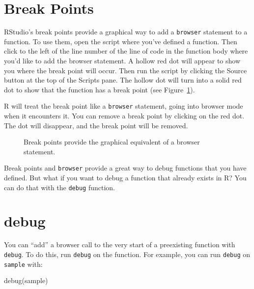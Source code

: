 \documentclass[
  letterpaper,
  DIV=11,
  numbers=noendperiod]{scrbook}
\makeatletter
\newenvironment{Shaded}{\begin{snugshade}}{\end{snugshade}}
\newcommand{\FunctionTok}[1]{\textcolor[rgb]{0.28,0.35,0.67}{#1}}
\newcommand{\NormalTok}[1]{\textcolor[rgb]{0.00,0.23,0.31}{#1}}
\newcommand*\pandocbounded[1]{%
  \sbox\pandoc@box{#1}%
  \Gscale@div\@tempa{\textheight}{\dimexpr\ht\pandoc@box+\dp\pandoc@box\relax}%
  \Gscale@div\@tempb{\linewidth}{\wd\pandoc@box}%
  \ifdim\@tempb\p@<\@tempa\p@\let\@tempa\@tempb\fi%
  \ifdim\@tempa\p@<\p@\scalebox{\@tempa}{\usebox\pandoc@box}%
  \else\usebox{\pandoc@box}%
  \fi%
}
\makeatother
\begin{document}
\section{Break Points}\label{break-points}

RStudio's break points provide a graphical way to add a \texttt{browser}
statement to a function. To use them, open the script where you've
defined a function. Then click to the left of the line number of the
line of code in the function body where you'd like to add the browser
statement. A hollow red dot will appear to show you where the break
point will occur. Then run the script by clicking the Source button at
the top of the Scripts pane. The hollow dot will turn into a solid red
dot to show that the function has a break point (see
Figure~\ref{fig-break-point}).

R will treat the break point like a \texttt{browser} statement, going
into browser mode when it encounters it. You can remove a break point by
clicking on the red dot. The dot will disappear, and the break point
will be removed.

\begin{figure}

\centering{

\pandocbounded{\texttt{[image: images/hopr\_ae05.png]}}

}

\caption{\label{fig-break-point}Break points provide the graphical
equivalent of a browser statement.}

\end{figure}%

Break points and \texttt{browser} provide a great way to debug functions
that you have defined. But what if you want to debug a function that
already exists in R? You can do that with the \texttt{debug} function.

\section{debug}\label{debug}

You can ``add'' a browser call to the very start of a preexisting
function with \texttt{debug}. To do this, run \texttt{debug} on the
function. For example, you can run \texttt{debug} on \texttt{sample}
with:

\begin{Shaded}
\begin{Highlighting}[]
\FunctionTok{debug}\NormalTok{(sample)}
\end{Highlighting}
\end{Shaded}
\end{document}
